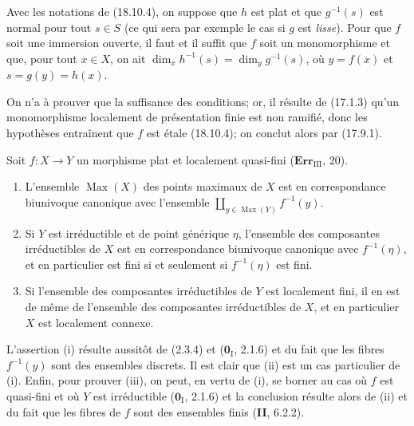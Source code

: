 \begin{corollary}[18.10.5]
\label{IV.18.10.5}
Avec les notations de \textup{(18.10.4)}, on suppose que $h$ est plat et que $g^{-1}(s)$ est normal pour tout $s\in S$ \textup{(ce qui sera par exemple le cas si $g$ est \emph{lisse})}. Pour que $f$ soit une immersion ouverte, il faut et il suffit que $f$ soit un monomorphisme et que, pour tout $x\in X$, on ait $\dim_xh^{-1}(s)=\dim_yg^{-1}(s)$, où $y=f(x)$ et $s=g(y)=h(x)$.
\end{corollary}

On n'a à prouver que la suffisance des conditions; or, il résulte de (17.1.3) qu'un monomorphisme localement de présentation finie est non ramifié, donc les hypothèses entraînent que $f$ est étale (18.10.4); on conclut alors par (17.9.1).

\begin{lemma}[18.10.6]
\label{IV.18.10.6}
Soit $f:X\to Y$ un morphisme plat et localement quasi-fini \textup{($\mathbf{Err}_{\mathrm{III}}$, 20)}.
\begin{enumerate}
  \item[\textup{(i)}] L'ensemble $\operatorname{Max}(X)$ des points maximaux de $X$ est en correspondance biunivoque canonique avec l'ensemble $\coprod_{y\in\operatorname{Max}(Y)}f^{-1}(y)$.
  \item[\textup{(ii)}] Si $Y$ est irréductible et de point générique $\eta$, l'ensemble des composantes irréductibles de $X$ est en correspondance biunivoque canonique avec $f^{-1}(\eta)$, et en particulier est fini si et seulement si $f^{-1}(\eta)$ est fini.


  \item[\textup{(iii)}] Si l'ensemble des composantes irréductibles de $Y$ est localement fini, il en est de même de l'ensemble des composantes irréductibles de $X$, et en particulier $X$ est localement connexe.
\end{enumerate}
\end{lemma}

L'assertion (i) résulte aussitôt de (2.3.4) et ($\mathbf{0}_{\mathrm I}$, 2.1.6) et du fait que les fibres $f^{-1}(y)$ sont des ensembles discrets. Il est clair que (ii) est un cas particulier de (i). Enfin, pour prouver (iii), on peut, en vertu de (i), se borner au cas où $f$ est quasi-fini et où $Y$ est irréductible ($\mathbf{0}_{\mathrm I}$, 2.1.6) et la conclusion résulte alors de (ii) et du fait que les fibres de $f$ sont des ensembles finis (\textbf{II}, 6.2.2).

